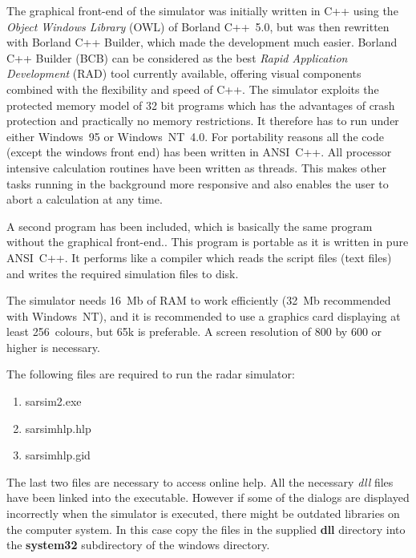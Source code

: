 The graphical front-end of the simulator was initially written in C++ using
the \textit{Object Windows Library }(OWL) of Borland C++~5.0, but was then
rewritten with Borland C++ Builder, which made the development much easier.
Borland C++ Builder (BCB) can be considered as the best \textit{Rapid
Application Development }(RAD) tool currently available, offering visual
components combined with the flexibility and speed of C++. The simulator
exploits the protected memory model of 32 bit programs which has the
advantages of crash protection and practically no memory restrictions. It
therefore has to run under either Windows~95 or Windows~NT~4.0. For
portability reasons all the code (except the windows front end) has been
written in ANSI~C++. All processor intensive calculation routines have been
written as threads. This makes other tasks running in the background more
responsive and also enables the user to abort a calculation at any time.

A second program has been included, which is basically the same program
without the graphical front-end.. This program is portable as it is written
in pure ANSI~C++. It performs like a compiler which reads the script files
(text files) and writes the required simulation files to disk.

The simulator needs 16~Mb of RAM to work efficiently (32~Mb recommended with
Windows~NT), and it is recommended to use a graphics card displaying at
least 256~colours, but 65k is preferable. A screen resolution of 800 by 600
or higher is necessary.

The following files are required to run the radar simulator:

\begin{itemize}
\begin{enumerate}
\item  sarsim2.exe

\item  sarsimhlp.hlp

\item  sarsimhlp.gid
\end{enumerate}
\end{itemize}

The last two files are necessary to access online help. All the necessary 
\textit{dll} files have been linked into the executable. However if some of
the dialogs are displayed incorrectly when the simulator is executed, there
might be outdated libraries on the computer system. In this case copy the
files in the supplied \textbf{\TEXTsymbol{\backslash}dll} directory into the 
\textbf{\TEXTsymbol{\backslash}system32} subdirectory of the windows
directory.

